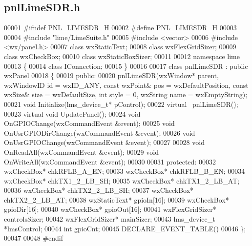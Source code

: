 \subsection{pnl\+Lime\+S\+D\+R.\+h}
\label{pnlLimeSDR_8h_source}

\begin{DoxyCode}
00001 \textcolor{preprocessor}{#ifndef PNL\_LIMESDR\_H}
00002 \textcolor{preprocessor}{#define PNL\_LIMESDR\_H}
00003 
00004 \textcolor{preprocessor}{#include "lime/LimeSuite.h"}
00005 \textcolor{preprocessor}{#include <vector>}
00006 \textcolor{preprocessor}{#include <wx/panel.h>}
00007 \textcolor{keyword}{class }wxStaticText;
00008 \textcolor{keyword}{class }wxFlexGridSizer;
00009 \textcolor{keyword}{class }wxCheckBox;
00010 \textcolor{keyword}{class }wxStaticBoxSizer;
00011 
00012 \textcolor{keyword}{namespace }lime
00013 \{
00014 \textcolor{keyword}{class }IConnection;
00015 \}
00016 
00017 \textcolor{keyword}{class }pnlLimeSDR : \textcolor{keyword}{public} wxPanel
00018 \{
00019 \textcolor{keyword}{public}:
00020     pnlLimeSDR(wxWindow* parent, wxWindowID \textcolor{keywordtype}{id} = wxID\_ANY, \textcolor{keyword}{const} wxPoint& pos = wxDefaultPosition, \textcolor{keyword}{const} 
      wxSize& size = wxDefaultSize, \textcolor{keywordtype}{int} style = 0, wxString name = wxEmptyString);
00021     \textcolor{keywordtype}{void} Initialize(lms_device_t* pControl);
00022     \textcolor{keyword}{virtual} ~pnlLimeSDR();
00023     \textcolor{keyword}{virtual} \textcolor{keywordtype}{void} UpdatePanel();
00024     \textcolor{keywordtype}{void} OnGPIOChange(wxCommandEvent &event);
00025     \textcolor{keywordtype}{void} OnUsrGPIODirChange(wxCommandEvent &event);
00026     \textcolor{keywordtype}{void} OnUsrGPIOChange(wxCommandEvent &event);
00027 
00028     \textcolor{keywordtype}{void} OnReadAll(wxCommandEvent &event);
00029     \textcolor{keywordtype}{void} OnWriteAll(wxCommandEvent &event);
00030 
00031 \textcolor{keyword}{protected}:
00032     wxCheckBox* chkRFLB_A_EN;
00033     wxCheckBox* chkRFLB_B_EN;
00034     wxCheckBox* chkTX1_2_LB_SH;
00035     wxCheckBox* chkTX1_2_LB_AT;
00036     wxCheckBox* chkTX2_2_LB_SH;
00037     wxCheckBox* chkTX2_2_LB_AT;
00038     wxStaticText* gpioIn[16];
00039     wxCheckBox* gpioDir[16];
00040     wxCheckBox* gpioOut[16];
00041     wxFlexGridSizer* controlsSizer;
00042     wxFlexGridSizer* mainSizer;
00043     lms_device_t *lmsControl;
00044     \textcolor{keywordtype}{int} gpioCnt;
00045     DECLARE\_EVENT\_TABLE()
00046 \};
00047 
00048 \textcolor{preprocessor}{#endif}
\end{DoxyCode}
